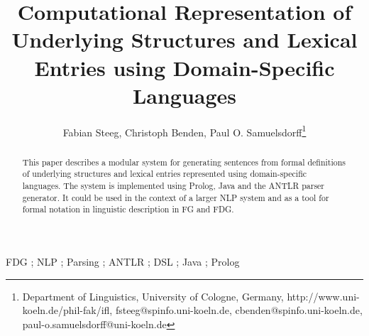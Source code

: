 \documentclass[a4paper, halfparskip, onecolumn, abstractoff, final]{scrartcl}
\begin{document}
\subject{Paper for \emph{Advances in FDG} based on a Poster presented at ICFG12}
\title{\Large Computational Representation of Underlying Structures and Lexical Entries using Domain-Specific Languages}
\author{Fabian Steeg, Christoph Benden, Paul O. Samuelsdorff\footnote{Department of Linguistics, University of Cologne, Germany, http://www.uni-koeln.de/phil-fak/ifl, fsteeg@spinfo.uni-koeln.de, cbenden@spinfo.uni-koeln.de, paul-o.samuelsdorff@uni-koeln.de}}

\maketitle

\begin{abstract}This paper describes a modular system for generating sentences from formal definitions of underlying structures and lexical entries represented using domain-specific languages. The system is implemented using Prolog, Java and the ANTLR parser generator. It could be used in the context of a larger NLP system and as a tool for formal notation in linguistic description in FG and FDG. \end{abstract}
\begin{center}
FDG ; NLP ; Parsing ; ANTLR ; DSL ; Java ; Prolog
\end{center}
\doublespacing






\end{document}
